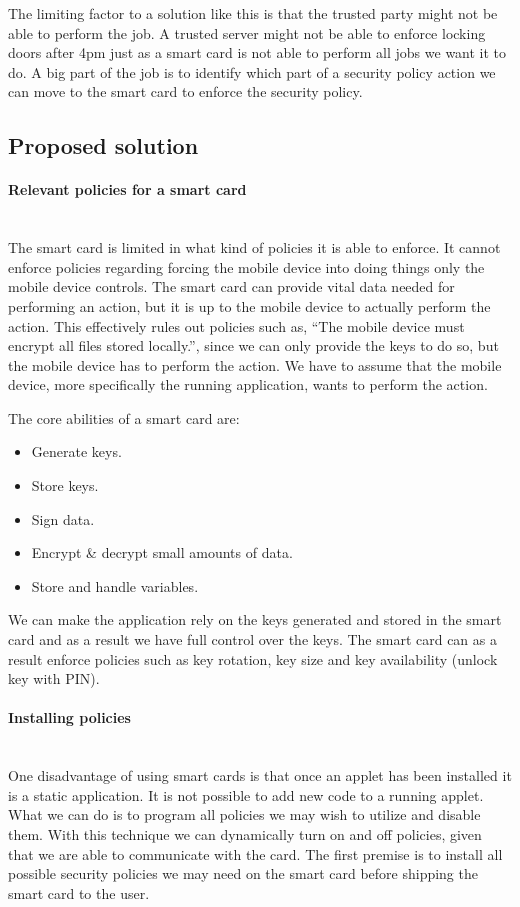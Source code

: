 The limiting factor to a solution like this is that the trusted party might not be able to perform the job. A trusted server might not be able to enforce locking doors after 4pm just as a smart card is not able to perform all jobs we want it to do. A big part of the job is to identify which part of a security policy action we can move to the smart card to enforce the security policy.

\subsection{Proposed solution}
\label{sec:policySolution}

\paragraph{Relevant policies for a smart card}\mbox{}\\
The smart card is limited in what kind of policies it is able to enforce. It cannot enforce policies regarding forcing the mobile device into doing things only the mobile device controls. The smart card can provide vital data needed for performing an action, but it is up to the mobile device to actually perform the action. This effectively rules out policies such as, ``The mobile device must encrypt all files stored locally.'', since we can only provide the keys to do so, but the mobile device has to perform the action. We have to assume that the mobile device, more specifically the running application, wants to perform the action.

The core abilities of a smart card are:
\begin{itemize}
    \item Generate keys.
    \item Store keys.
    \item Sign data.
    \item Encrypt \& decrypt small amounts of data.
    \item Store and handle variables.
\end{itemize}

We can make the application rely on the keys generated and stored in the smart card and as a result we have full control over the keys. The smart card can as a result enforce policies such as key rotation, key size and key availability (unlock key with PIN).

\paragraph{Installing policies}\mbox{}\\
One disadvantage of using smart cards is that once an applet has been installed it is a static application. It is not possible to add new code to a running applet. What we can do is to program all policies we may wish to utilize and disable them. With this technique we can dynamically turn on and off policies, given that we are able to communicate with the card. The first premise is to install all possible security policies we may need on the smart card before shipping the smart card to the user.


